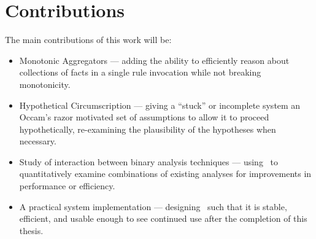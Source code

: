 \section{Contributions}
The main contributions of this work will be:
\begin{itemize}
        \item Monotonic Aggregators --- adding the ability to efficiently reason about collections of facts in a single rule invocation while not breaking monotonicity.
        \item Hypothetical Circumscription --- giving a ``stuck'' or incomplete system an Occam's razor motivated set of assumptions to allow it to proceed hypothetically, re-examining the plausibility of the hypotheses when necessary.
        \item Study of interaction between binary analysis techniques --- using \sysname\ to quantitatively examine combinations of existing analyses for improvements in performance or efficiency.
        \item A practical system implementation --- designing \sysname\ such that it is stable, efficient, and usable enough to see continued use after the completion of this thesis.
\end{itemize}
